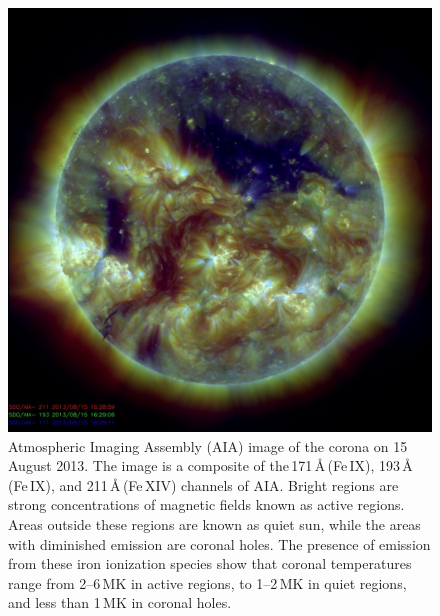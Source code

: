 \begin{figure}[!t]
\begin{center}
\includegraphics[scale=0.3]{images/211_193_171.png}
\caption[AIA image of the corona]{Atmospheric Imaging Assembly (AIA) image of the corona on 15 August 2013. The image is a composite of the\,171\,\AA\,(Fe\,IX), 193\,\AA\,(Fe\,IX), and 211\,\AA\,(Fe\,XIV) channels of AIA. Bright regions are strong concentrations of magnetic fields known as active regions. Areas outside these regions are known as quiet sun, while the areas with diminished emission are coronal holes. The presence of emission from these iron ionization species show that coronal temperatures range from 2--6\,MK in active regions, to 1--2\,MK in quiet regions, and less than 1\,MK in coronal holes.}
\label{fig:aia_corona} 
\end{center}
\end{figure}

